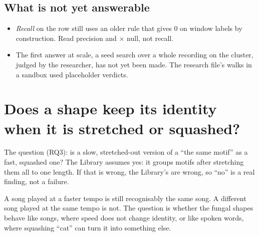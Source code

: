 \subsection*{What is not yet answerable}
\begin{itemize}
\item \emph{Recall} on the row still uses an older rule that gives 0 on window labels by
  construction. Read precision and × null, not recall.
\item The first answer at scale, a seed search over a whole recording on the cluster, judged
  by the researcher, has not yet been made. The research file's walks in a sandbox used
  placeholder verdicts.
\end{itemize}

\section{Does a shape keep its identity when it is stretched or squashed?}\label{sec:workflows-rq3}
The question (RQ3): is a slow, stretched-out version of a  ``the same
motif'' as a fast, squashed one? The Library assumes yes: it groups motifs after stretching
them all to one length. If that is wrong, the Library's  are wrong, so
``no'' is a real finding, not a failure.

\begin{plainterms}
A song played at a faster tempo is still recognisably the same song. A different song played
at the same tempo is not. The question is whether the fungal shapes behave like songs, where
speed does not change identity, or like spoken words, where squashing ``cat'' can turn it
into something else.
\end{plainterms}

